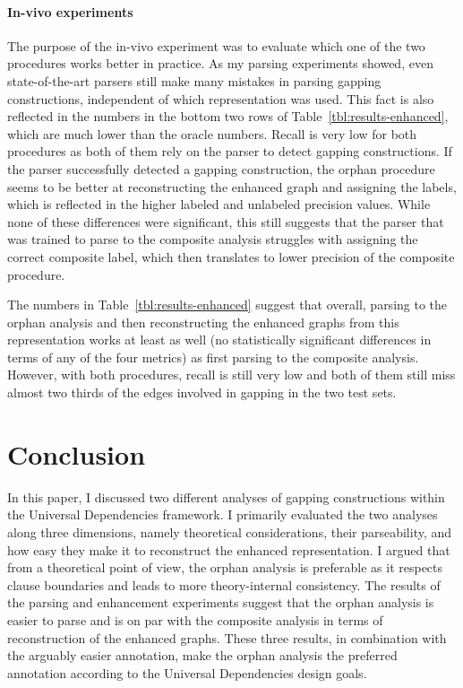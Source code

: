 \documentclass[lucida,biblatex]{sp} %
\begin{document}
\paragraph{In-vivo experiments}
The purpose of the in-vivo experiment was to evaluate which one of the two procedures works better in practice. As my parsing experiments showed, even state-of-the-art parsers still make many mistakes in parsing gapping constructions, independent of which representation was used. This fact is also reflected in the numbers in the bottom two rows of Table~\ref{tbl:results-enhanced}, which are much lower than the oracle numbers.  Recall is very low for both procedures as both of them rely on the parser to detect gapping constructions. If the parser successfully detected a gapping construction, the {\sc orphan} procedure seems to be better at reconstructing the enhanced graph and assigning the labels, which is reflected in the higher labeled and unlabeled precision values. While none of these differences were significant, this still suggests that the parser that was trained to parse to the {\sc composite} analysis struggles with assigning the correct composite label, which then translates to lower precision of the {\sc composite} procedure.

The numbers in Table~\ref{tbl:results-enhanced} suggest that overall, parsing to the {\sc orphan} analysis and then reconstructing the enhanced graphs from this representation works at least as well (no statistically significant differences in terms of any of the four metrics) as first parsing to the {\sc composite} analysis. However, with both procedures, recall is still very low and both of them still miss almost two thirds of the edges involved in gapping in the two test sets.

\section{Conclusion}

In this paper, I discussed two different analyses of gapping constructions within the Universal Dependencies framework. I primarily evaluated the two analyses along three dimensions, namely theoretical considerations, their parseability, and how easy they make it to reconstruct the enhanced representation. I argued that from a theoretical point of view, the {\sc orphan} analysis is preferable as it respects clause boundaries and leads to more theory-internal consistency. The results of the parsing and enhancement experiments suggest that the {\sc orphan} analysis is easier to parse and is on par with the {\sc composite} analysis in terms of reconstruction of the enhanced graphs. These three results, in combination with the arguably easier annotation, make the {\sc orphan} analysis the preferred annotation according to the Universal Dependencies design goals.
\end{document}
